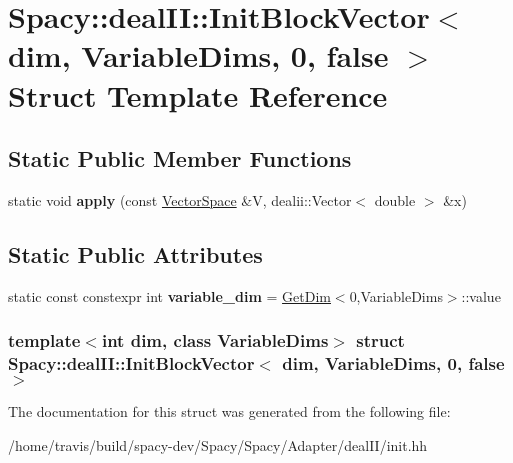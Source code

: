 \hypertarget{structSpacy_1_1dealII_1_1InitBlockVector_3_01dim_00_01VariableDims_00_010_00_01false_01_4}{\section{\-Spacy\-:\-:deal\-I\-I\-:\-:\-Init\-Block\-Vector$<$ dim, \-Variable\-Dims, 0, false $>$ \-Struct \-Template \-Reference}
\label{structSpacy_1_1dealII_1_1InitBlockVector_3_01dim_00_01VariableDims_00_010_00_01false_01_4}
}
\subsection*{\-Static \-Public \-Member \-Functions}
\begin{DoxyCompactItemize}
\item 
\hypertarget{structSpacy_1_1dealII_1_1InitBlockVector_3_01dim_00_01VariableDims_00_010_00_01false_01_4_aea4cb591d2b5996e60a2f11c600069b5}{static void {\bfseries apply} (const \hyperlink{classSpacy_1_1VectorSpace}{\-Vector\-Space} \&\-V, dealii\-::\-Vector$<$ double $>$ \&x)}\label{structSpacy_1_1dealII_1_1InitBlockVector_3_01dim_00_01VariableDims_00_010_00_01false_01_4_aea4cb591d2b5996e60a2f11c600069b5}

\end{DoxyCompactItemize}
\subsection*{\-Static \-Public \-Attributes}
\begin{DoxyCompactItemize}
\item 
\hypertarget{structSpacy_1_1dealII_1_1InitBlockVector_3_01dim_00_01VariableDims_00_010_00_01false_01_4_a098536881bb5c87b6b93138c64274105}{static const constexpr int {\bfseries variable\-\_\-dim} = \hyperlink{structSpacy_1_1dealII_1_1GetDim}{\-Get\-Dim}$<$0,\-Variable\-Dims$>$\-::value}\label{structSpacy_1_1dealII_1_1InitBlockVector_3_01dim_00_01VariableDims_00_010_00_01false_01_4_a098536881bb5c87b6b93138c64274105}

\end{DoxyCompactItemize}
\subsubsection*{template$<$int dim, class Variable\-Dims$>$ struct Spacy\-::deal\-I\-I\-::\-Init\-Block\-Vector$<$ dim, Variable\-Dims, 0, false $>$}



\-The documentation for this struct was generated from the following file\-:\begin{DoxyCompactItemize}
\item 
/home/travis/build/spacy-\/dev/\-Spacy/\-Spacy/\-Adapter/deal\-I\-I/init.\-hh\end{DoxyCompactItemize}
